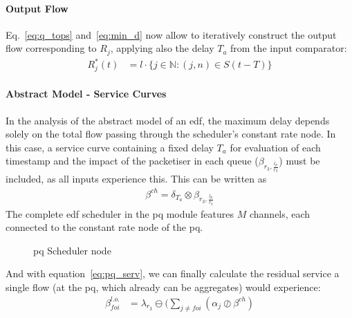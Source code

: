 \paragraph{Output Flow}
Eq.~\ref{eq:q_tops} and~\ref{eq:min_d} now allow to iteratively construct the output flow corresponding to $R_j$,
applying also the delay $T_a$ from the input comparator:
%
\begin{equation}
\begin{aligned}
R_j^*(t) &= l \cdot \{ j \in \mathbb{N} : (j,n) \in S(t-T) \}
\label{eq:ch_serv}
\end{aligned}
\end{equation}
%

\fi

\paragraph{Abstract Model - Service Curves}

In the analysis of the abstract model of an \gls{edf}, the maximum delay depends solely on the total flow passing through the scheduler's constant rate node.
In this case, a service curve containing a fixed delay $T_a$ for evaluation of each timestamp and the impact of the packetiser in each queue ($\beta_{r_3, \frac{l_p}{r_3}}$) must be
included, as all inputs experience this. This can be written as
\begin{equation}
\begin{aligned}
\beta^{ch} = \delta_{T_a} \otimes \beta_{r_3, \frac{l_p}{r_3}} 
\label{eq:pq_serv}
\end{aligned}
\end{equation}
%
The complete \gls{edf} scheduler in the \gls{pq} module features $M$ channels, each connected to the constant rate node of the \gls{pq}.
%
\begin{figure}[H]
  \centering
  \def\svgwidth{0.55\textwidth}
  
  \caption{\gls{pq} Scheduler node}
  \label{fig:pq-edf}
\end{figure}
\noindent
And with equation~\ref{eq:pq_serv}, we can finally calculate the residual service a single flow (at the \gls{pq}, which already can be aggregates) would experience:
%
\begin{equation}
\begin{aligned}
\beta_{foi}^{l.o.} &= \lambda_{r_3} \ominus ( \sum_{j \neq foi} (\alpha_j \oslash \beta^{ch})\\
\label{eq:foi_serv}
\end{aligned}
\end{equation}

